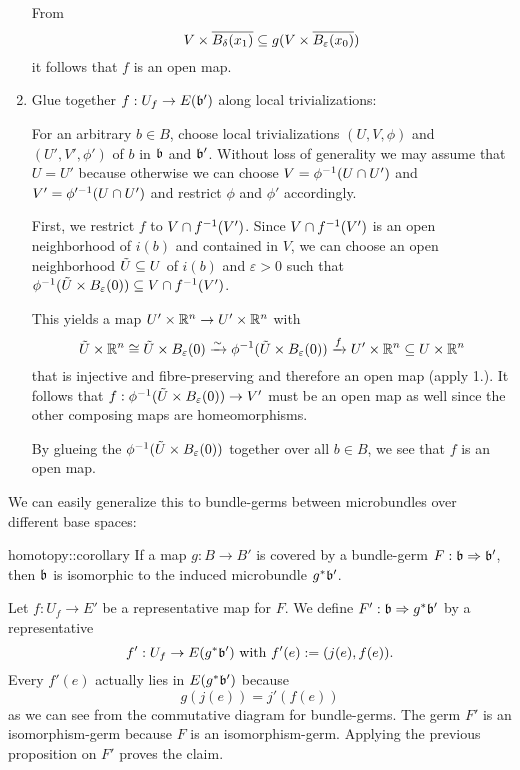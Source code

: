 \begin{myproof}
\begin{enumerate}
        From
        \[ V \times \clball[\delta][x_1] \sub g(V \times \clball[\varepsilon][x_0]) \]
        it follows that $f$ is an open map.

        \item Glue together $f: U_f \to E(\mathfrak{b}')$ along local trivializations:

        For an arbitrary $b \in B$, choose local trivializations $(U, V, \phi)$ and $(U', V', \phi')$ of $b$ in $\mathfrak{b}$ and $\mathfrak{b}'$.
        Without loss of generality we may assume that $U = U'$ because otherwise we can choose $V = \phi^{-1}(U \cap U')$ and $V' = \phi'^{-1}(U \cap U')$
        and restrict $\phi$ and $\phi'$ accordingly.   
        
        First, we restrict $f$ to $V \cap f^{-1}(V')$. Since $V \cap f^{-1}(V')$ is an open neighborhood of $i(b)$ and contained in $V$, we can choose
        an open neighborhood $\tilde{U} \subseteq{} U$ of $i(b)$ and $\varepsilon > 0$ such that $\inv{\phi}(\tilde{U} \times \ball[\varepsilon]) \sub V \cap \inv{f}(V')$.
        
        This yields a map $U' \times \mathbb{R}^n \to U' \times \mathbb{R}^n$ with
        \[ \tilde{U} \times \R^n \cong  \tilde{U} \times \ball[\varepsilon] \isomto \inv{\phi}(\tilde{U} \times \ball[\varepsilon]) \xto{f} U' \times \R^n \sub U \times \R^n \]
        that is injective and fibre-preserving and therefore an open map (apply 1.).
        It follows that $f: \inv{\phi}(\tilde{U} \times \ball[\varepsilon]) \to V'$ must be an open map as well since the other composing maps are homeomorphisms.

        By glueing the $\inv{\phi}(\tilde{U} \times \ball[\varepsilon])$ together over all $b \in B$, we see that $f$ is an open map.
    \end{enumerate}
\end{myproof}

\begin{myparagraph}
    We can easily generalize this to bundle-germs between microbundles over different base spaces:
\end{myparagraph}

\begin{mycorollary}{homotopy::corollary}
    If a map $g: B \to B'$ is covered by a bundle-germ $F: \mathfrak{b} \Rightarrow{} \mathfrak{b}'$, then $\mathfrak{b}$ is isomorphic to the induced microbundle $g^*\mathfrak{b}'$.
\end{mycorollary}
\begin{myproof}
    Let $f: U_f \to E'$ be a representative map for $F$.
    We define $F': \mathfrak{b} \Rightarrow{} g^*\mathfrak{b}'$ by a representative
    \[ f': U_f \to E(g^*\mathfrak{b}') \text{ with } f'(e) := (j(e), f(e)). \]
    Every $f'(e)$ actually lies in $E(g^*\mathfrak{b}')$ because
    \[ g(j(e)) = j'(f(e)) \]
    as we can see from the commutative diagram for bundle-germs.
    The germ $F'$ is an isomorphism-germ because $F$ is an isomorphism-germ.
    Applying the previous proposition on $F'$ proves the claim.
\end{myproof}